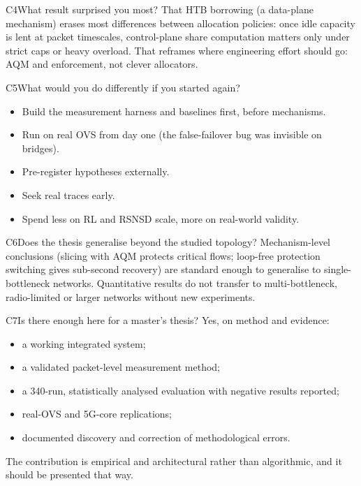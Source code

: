 \begin{qa}{C4}{What result surprised you most?}
That HTB borrowing (a data-plane mechanism) erases most differences between allocation policies: once idle capacity is
lent at packet timescales, control-plane share computation matters only under strict caps or heavy overload. That
reframes where engineering effort should go: AQM and enforcement, not clever allocators.
\end{qa}

\begin{qa}{C5}{What would you do differently if you started again?}
\begin{itemize}
\item Build the measurement harness and baselines first, before mechanisms.
\item Run on real OVS from day one (the false-failover bug was invisible on bridges).
\item Pre-register hypotheses externally.
\item Seek real traces early.
\item Spend less on RL and RSNSD scale, more on real-world validity.
\end{itemize}
\end{qa}

\begin{qa}{C6}{Does the thesis generalise beyond the studied topology?}
Mechanism-level conclusions (slicing with AQM protects critical flows; loop-free protection switching gives sub-second
recovery) are standard enough to generalise to single-bottleneck networks. Quantitative results do not transfer to
multi-bottleneck, radio-limited or larger networks without new experiments.
\end{qa}

\begin{qa}{C7}{Is there enough here for a master's thesis?}
Yes, on method and evidence:
\begin{itemize}
\item a working integrated system;
\item a validated packet-level measurement method;
\item a 340-run, statistically analysed evaluation with negative results reported;
\item real-OVS and 5G-core replications;
\item documented discovery and correction of methodological errors.
\end{itemize}
The contribution is empirical and architectural rather than algorithmic, and it should be presented that way.
\end{qa}


